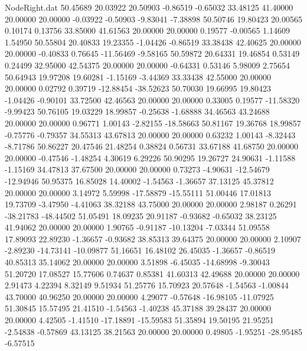 \begin{filecontents}{NodeRight.dat}
  50.45689   20.03922   20.50903    -0.86519   -0.65032   33.48125   41.40000   20.00000   20.00000   -0.03922   -0.50903   -9.83041   -7.38898
  50.50746   19.80423   20.00565     0.10174    0.13756   33.85000   41.61563   20.00000   20.00000    0.19577   -0.00565    1.14609    1.54950
  50.55804   20.40833   19.23355    -1.04426   -0.86519   33.38438   42.40625   20.00000   20.00000   -0.40833    0.76645  -11.56469   -9.58165
  50.59872   20.64331   19.46854     0.53149    0.24499   32.95000   42.54375   20.00000   20.00000   -0.64331    0.53146    5.98009    2.75654
  50.64943   19.97208   19.60281    -1.15169   -3.44369   33.33438   42.55000   20.00000   20.00000    0.02792    0.39719  -12.88454  -38.52623
  50.70030   19.66995   19.80423    -1.04426   -0.90101   33.72500   42.46563   20.00000   20.00000    0.33005    0.19577  -11.58320   -9.99423
  50.76105   19.03229   18.99857    -0.25638   -1.68888   34.46563   43.24688   20.00000   20.00000    0.96771    1.00143   -2.82155  -18.58663
  50.81167   19.36768   18.99857    -0.75776   -0.79357   34.55313   43.67813   20.00000   20.00000    0.63232    1.00143   -8.32443   -8.71786
  50.86227   20.47546   21.48254     0.38824    0.56731   33.67188   41.68750   20.00000   20.00000   -0.47546   -1.48254    4.30619    6.29226
  50.90295   19.26727   24.90631    -1.11588   -1.15169   34.47813   37.67500   20.00000   20.00000    0.73273   -4.90631  -12.54679  -12.94946
  50.95375   16.85028   14.40002    -1.54563   -1.36657   37.13125   45.37812   20.00000   20.00000    3.14972    5.59998  -17.58879  -15.55111
  51.00446   17.01813   19.73709    -3.47950   -4.41063   38.32188   43.75000   20.00000   20.00000    2.98187    0.26291  -38.21783  -48.44502
  51.05491   18.09235   20.91187    -0.93682   -0.65032   38.23125   41.94062   20.00000   20.00000    1.90765   -0.91187  -10.13204   -7.03344
  51.09558   17.89093   22.89230    -1.36657   -0.93682   38.85313   39.64375   20.00000   20.00000    2.10907   -2.89230  -14.73141  -10.09877
  51.16651   16.48102   26.45035    -1.36657   -0.86519   40.85313   35.14062   20.00000   20.00000    3.51898   -6.45035  -14.68998   -9.30043
  51.20720   17.08527   15.77606     0.74637    0.85381   41.60313   42.49688   20.00000   20.00000    2.91473    4.22394    8.32149    9.51934
  51.25776   15.70923   20.57648    -1.54563   -1.00844   43.70000   40.96250   20.00000   20.00000    4.29077   -0.57648  -16.98105  -11.07925
  51.30845   15.57495   21.41510    -1.54563   -1.40238   45.37188   39.28437   20.00000   20.00000    4.42505   -1.41510  -17.18891  -15.59583
  51.35894   19.50195   21.95251    -2.54838   -0.57869   43.13125   38.21563   20.00000   20.00000    0.49805   -1.95251  -28.95485   -6.57515

\end{filecontents}
